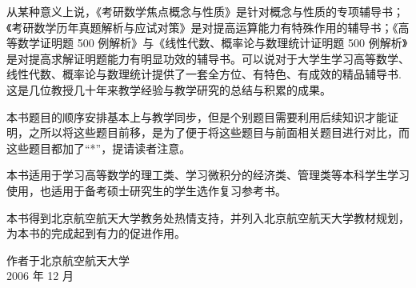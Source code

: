 \begin{enumerate}
\begin{xiaoti}
      从某种意义上说，《考研数学焦点概念与性质》是针对概念与性质的专项辅导书；《考研数学历年真题解析与应试对策》是对提高运算能力有特殊作用的辅导书；《高等数学证明题 500 例解析》与《线性代数、概率论与数理统计证明题 500 例解析》是对提高求解证明题能力有明显功效的辅导书。可以说对于大学生学习高等数学、线性代数、概率论与数理统计提供了一套全方位、有特色、有成效的精品辅导书.这是几位教授几十年来教学经验与教学研究的总结与积累的成果。
    \end{xiaoti}
  本书题目的顺序安排基本上与教学同步，但是个别题目需要利用后续知识才能证明，之所以将这些题目前移，是为了便于将这些题目与前面相关题目进行对比，而这些题目都加了“*”，提请读者注意。

  本书适用于学习高等数学的理工类、学习微积分的经济类、管理类等本科学生学习使用，也适用于备考硕士研究生的学生选作复习参考书。

  本书得到北京航空航天大学教务处热情支持，并列入北京航空航天大学教材规划，为本书的完成起到有力的促进作用。
  \begin{flushright}
    作者于北京航空航天大学\\
    2006 年 12 月
  \end{flushright}
  \end{enumerate}
